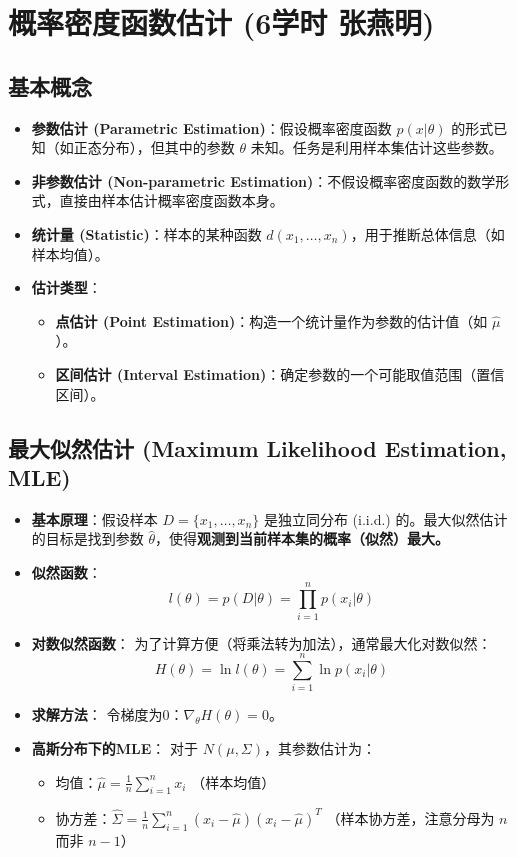 \documentclass[a4paper, 11pt]{ctexart}
\begin{document}
\section{概率密度函数估计 \small{(6学时 张燕明)}}

\subsection{基本概念}
\begin{itemize}
    \item \textbf{参数估计 (Parametric Estimation)}：假设概率密度函数 $p(x|\theta)$ 的形式已知（如正态分布），但其中的参数 $\theta$ 未知。任务是利用样本集估计这些参数。
    \item \textbf{非参数估计 (Non-parametric Estimation)}：不假设概率密度函数的数学形式，直接由样本估计概率密度函数本身。
    \item \textbf{统计量 (Statistic)}：样本的某种函数 $d(x_1, \dots, x_n)$，用于推断总体信息（如样本均值）。
    \item \textbf{估计类型}：
    \begin{itemize}
        \item \textbf{点估计 (Point Estimation)}：构造一个统计量作为参数的估计值（如 $\hat{\mu}$）。
        \item \textbf{区间估计 (Interval Estimation)}：确定参数的一个可能取值范围（置信区间）。
    \end{itemize}
\end{itemize}

\subsection{最大似然估计 (Maximum Likelihood Estimation, MLE)}
\begin{itemize}
    \item \textbf{基本原理}：假设样本 $D=\{x_1, \dots, x_n\}$ 是独立同分布 (i.i.d.) 的。最大似然估计的目标是找到参数 $\hat{\theta}$，使得\textbf{观测到当前样本集的概率（似然）最大。}
    \item \textbf{似然函数}：
    \begin{equation}
        l(\theta) = p(D|\theta) = \prod_{i=1}^n p(x_i|\theta)
    \end{equation}
    \item \textbf{对数似然函数}：
    为了计算方便（将乘法转为加法），通常最大化对数似然：
    \begin{equation}
        H(\theta) = \ln l(\theta) = \sum_{i=1}^n \ln p(x_i|\theta)
    \end{equation}
    \item \textbf{求解方法}：
    令梯度为0：$\nabla_\theta H(\theta) = 0$。
    \item \textbf{高斯分布下的MLE}：
    对于 $N(\mu, \Sigma)$，其参数估计为：
    \begin{itemize}
        \item 均值：$\hat{\mu} = \frac{1}{n}\sum_{i=1}^n x_i$ （样本均值）
        \item 协方差：$\hat{\Sigma} = \frac{1}{n}\sum_{i=1}^n (x_i - \hat{\mu})(x_i - \hat{\mu})^T$ （样本协方差，注意分母为 $n$ 而非 $n-1$）
    \end{itemize}
\end{itemize}
\end{document}
